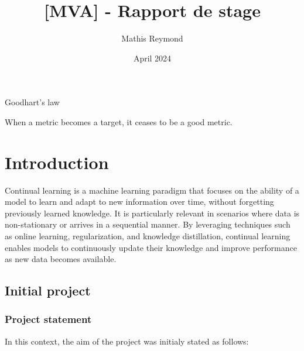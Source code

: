 \documentclass{article}
\title{[MVA] - Rapport de stage}
\author{Mathis Reymond}
\date{April 2024}
\begin{document}
\maketitle
\epigraph{Goodhart's law}{When a metric becomes a target, it ceases to be a good metric.}

\section{Introduction}

Continual learning is a machine learning paradigm that focuses on the ability of a model to learn and adapt to new information over time, without forgetting previously learned knowledge. It is particularly relevant in scenarios where data is non-stationary or arrives in a sequential manner. By leveraging techniques such as online learning, regularization, and knowledge distillation, continual learning enables models to continuously update their knowledge and improve performance as new data becomes available.

\subsection{Initial project}
\subsubsection{Project statement}

In this context, the aim of the project was initialy stated as follows:
\end{document}
